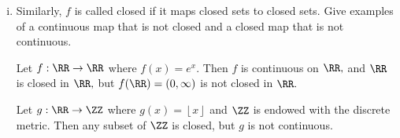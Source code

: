 \documentclass{article}
\begin{document}
\begin{itemize}
\begin{enumerate}[(i)]
			\item Similarly, $f$ is called closed if it maps closed sets to closed sets. Give examples of a continuous map that is not closed and a closed map that is not continuous. 
				\begin{soln}
					Let $f:\RR\to\RR$ where $f(x)=e^x.$ Then $f$ is continuous on $\RR,$ and $\RR$ is closed in $\RR,$ but $f(\RR)=(0, \infty)$ is not closed in $\RR.$

					Let $g:\RR\to\ZZ$ where $g(x)=\left\lfloor x \right\rfloor$ and $\ZZ$ is endowed with the discrete metric. Then any subset of $\ZZ$ is closed, but $g$ is not continuous.
				\end{soln}
				
		\end{enumerate}
		
\end{itemize}
\end{document}
